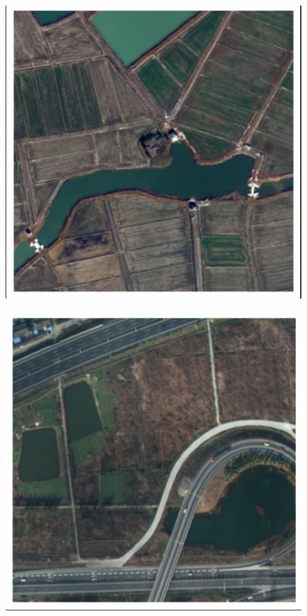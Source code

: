 \documentclass{article}
\begin{document}
\begin{multicols}{2}
		

	
		\begin{figure}[H]
			\centering
			\begin{minipage}{0.48\linewidth}
				\centering
				\includegraphics[width=\linewidth]{image/rural_1.png}
				\label{fig:dataset_rural_image}
			\end{minipage}
			\hfill
			\begin{minipage}{0.48\linewidth}
				\centering
				\includegraphics[width=\linewidth]{image/urban_3.png}
				\label{fig:dataset_urban_image}
			\end{minipage}
			

\end{figure}
\end{multicols}
\end{document}
